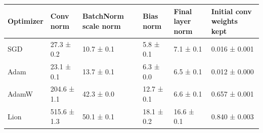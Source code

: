 \begin{tabular}{llllll}
\toprule
Optimizer & Conv norm & BatchNorm scale norm & Bias norm & Final layer norm & Initial conv weights kept \\
\midrule
SGD & 27.3 ± 0.2 & 10.7 ± 0.1 & 5.8 ± 0.1 & 7.1 ± 0.1 & 0.016 ± 0.001 \\
Adam & 23.1 ± 0.1 & 13.7 ± 0.1 & 6.3 ± 0.0 & 6.5 ± 0.1 & 0.012 ± 0.000 \\
AdamW & 204.6 ± 1.1 & 42.3 ± 0.0 & 12.7 ± 0.1 & 6.6 ± 0.1 & 0.657 ± 0.001 \\
Lion & 515.6 ± 1.3 & 50.1 ± 0.1 & 18.1 ± 0.2 & 16.6 ± 0.1 & 0.840 ± 0.003 \\
\bottomrule
\end{tabular}
